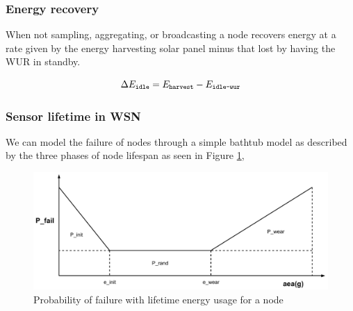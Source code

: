 \subsubsection{Energy recovery}

\newcommand{\setEnergyDeltaIdle}[2]{\Delta\setSymbol{E}{\texttt{idle}}{#2}}
\newcommand{\setEnergyHarvest}[2]{\setSymbol{E}{\texttt{harvest}}{#2}}
\newcommand{\setEnergyWUR}[2]{\setSymbol{E}{\texttt{idle-wur}}{#2}}

When not sampling, aggregating, or broadcasting a node recovers energy at a rate given by the energy harvesting solar panel minus that lost by having the WUR in standby.

\begin{equation}
	\setEnergyDeltaIdle{}{}
	= 
	\setEnergyHarvest{}{}
	-
	\setEnergyWUR{}{}
\end{equation}

\subsubsection{Sensor lifetime in WSN}
We can model the failure of nodes through a simple bathtub model as described by the three phases of node lifespan as seen in Figure \ref{fig:node_reliability_lifespan},

\begin{figure}
	\centering
	\includegraphics[width=0.7\linewidth]{node_reliability_lifespan}
	\caption[Probability of failure with lifetime energy usage for a node]{Probability of failure with lifetime energy usage for a node}
	\label{fig:node_reliability_lifespan}
\end{figure}

